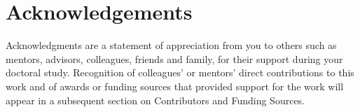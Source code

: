 \documentclass[\main/master.tex]{subfiles}
\begin{document}
\chapter*{Acknowledgements}
Acknowledgments are a statement of appreciation from you to others such as mentors, advisors, colleagues,
friends and family, for their support during your doctoral study. Recognition of colleagues’ or mentors’ direct
contributions to this work and of awards or funding sources that provided support for the work will appear in a
subsequent section on Contributors and Funding Sources.
\end{document}
